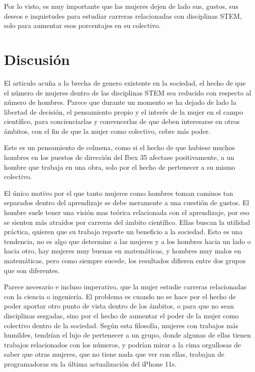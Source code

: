 Por lo visto, es muy importante que las mujeres dejen de lado sus, gustos, sus deseos e inquietudes para estudiar 
carreras relacionadas con disciplinas STEM, solo para aumentar esos porcentajes en su colectivo.

\section{Discusión}
\label{sec:discusion}

El articulo acuña a la brecha de genero existente en la sociedad, el hecho de que el número de mujeres dentro de las 
disciplinas STEM sea reducido con respecto al número de hombres. Parece que durante un momento se ha dejado de 
lado la libertad de decisión, el pensamiento propio y el interés de la mujer en el campo científico, para concienciarlas y 
convencerlas de que deben interesarse en otros ámbitos, con el fin de que la mujer como colectivo, cobre más poder.

Este es un pensamiento de colmena, como si el hecho de que hubiese muchos hombres en los puestos de dirección del 
Ibex 35 afectase positivamente, a un hombre que trabaja en una obra, solo por el hecho de pertenecer a su mismo colectivo.

El único motivo por el que tanto mujeres como hombres toman caminos tan separados dentro del aprendizaje se debe 
meramente a una cuestión de gustos. El hombre suele tener una visión mas teórica relacionada con el aprendizaje, por 
eso se sienten más atraídos por carreras del ámbito científico. Ellas buscan la utilidad práctica, quieren que su trabajo 
reporte un beneficio a la sociedad. Esto es una tendencia, no es algo que determine a las mujeres y a los hombres hacia 
un lado o hacia otro, hay mujeres muy buenas en matemáticas, y hombres muy malos en matemáticas, pero como siempre 
sucede, los resultados difieren entre dos grupos que son diferentes.

Parece necesario e incluso imperativo, que la mujer estudie carreras relacionadas con la ciencia o ingeniería. El problema es 
cuando no se hace por el hecho de poder aportar otro punto de vista dentro de los ámbitos, o para que no sean disciplinas 
sesgadas, sino por el hecho de aumentar el poder de la mujer como colectivo dentro de la sociedad. Según esta filosofía, 
mujeres con trabajos más humildes, tendrían el lujo de pertenecer a un grupo, donde algunas de ellas tienen trabajos
 relacionados con los números, y podrían mirar a la cima orgullosas de saber que otras mujeres, que no tiene nada que ver
 con ellas, trabajan de programadoras en la última actualización del iPhone 11s. 


